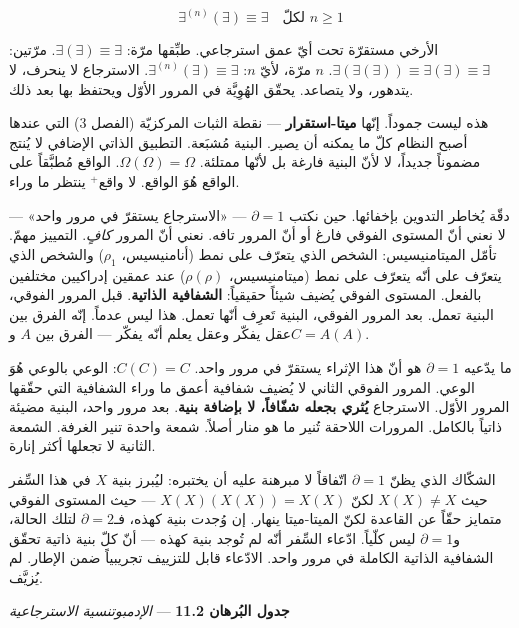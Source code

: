 \documentclass[10pt, openany, oneside]{book}
\begin{document}
$$\exists^{(n)}(\exists) \equiv \exists \quad \text{لكلّ } n \geq 1$$

الأرخي مستقرّة تحت أيّ عمق استرجاعي. طبِّقها مرّة: $\exists(\exists) \equiv \exists$. مرّتين: $\exists(\exists(\exists)) \equiv \exists(\exists) \equiv \exists$. $n$ مرّة، لأيّ $n$: $\exists^{(n)}(\exists) \equiv \exists$. الاسترجاع لا ينحرف، لا يتدهور، ولا يتصاعد. يحقّق الهُوِيَّة في المرور الأوّل ويحتفظ بها بعد ذلك.

هذه ليست جموداً. إنّها \textbf{ميتا-استقرار} --- نقطة الثبات المركزيّة (الفصل 3) التي عندها أصبح النظام كلّ ما يمكنه أن يصير. البنية مُشبَعة. التطبيق الذاتي الإضافي لا يُنتج مضموناً جديداً، لا لأنّ البنية فارغة بل لأنّها ممتلئة. $\Omega(\Omega) = \Omega$. الواقع مُطبَّقاً على الواقع هُوَ الواقع. لا واقع$^+$ ينتظر ما وراء.

دقّة يُخاطر التدوين بإخفائها. حين نكتب $\partial = 1$ --- «الاسترجاع يستقرّ في مرور واحد» --- لا نعني أنّ المستوى الفوقي فارغ أو أنّ المرور تافه. نعني أنّ المرور \textit{كافٍ}. التمييز مهمّ. تأمّل الميتامنيسيس: الشخص الذي يتعرّف على نمط (أنامنيسيس، $\rho_1$) والشخص الذي يتعرّف على أنّه يتعرّف على نمط (ميتامنيسيس، $\rho(\rho)$) عند عمقين إدراكيين مختلفين بالفعل. المستوى الفوقي يُضيف شيئاً حقيقياً: \textbf{الشفافية الذاتية}. قبل المرور الفوقي، البنية تعمل. بعد المرور الفوقي، البنية تَعرِف أنّها تعمل. هذا ليس عدماً. إنّه الفرق بين عقل يفكّر وعقل يعلم أنّه يفكّر --- الفرق بين $A$ و$C = A(A)$.

ما يدّعيه $\partial = 1$ هو أنّ هذا الإثراء يستقرّ في مرور واحد. $C(C) = C$: الوعي بالوعي هُوَ الوعي. المرور الفوقي الثاني لا يُضيف شفافية أعمق ما وراء الشفافية التي حقّقها المرور الأوّل. الاسترجاع \textbf{يُثري بجعله شفّافاً، لا بإضافة بنية}. بعد مرور واحد، البنية مضيئة ذاتياً بالكامل. المرورات اللاحقة تُنير ما هو منار أصلاً. شمعة واحدة تنير الغرفة. الشمعة الثانية لا تجعلها أكثر إنارة.

الشكّاك الذي يظنّ $\partial = 1$ اتّفاقاً لا مبرهنة عليه أن يختبره: ليُبرز بنية $X$ في هذا السِّفر حيث $X(X) \neq X$ لكنّ $X(X)(X(X)) = X(X)$ --- حيث المستوى الفوقي متمايز حقّاً عن القاعدة لكنّ الميتا-ميتا ينهار. إن وُجدت بنية كهذه، فـ$\partial = 2$ لتلك الحالة، و$\partial = 1$ ليس كلّياً. ادّعاء السِّفر أنّه لم تُوجد بنية كهذه --- أنّ كلّ بنية ذاتية تحقّق الشفافية الذاتية الكاملة في مرور واحد. الادّعاء قابل للتزييف تجريبياً ضمن الإطار. لم يُزيَّف.

\vspace{0.5em}

\textbf{جدول البُرهان 11.2} --- \textit{الإدمبوتنسية الاسترجاعية}
\end{document}
